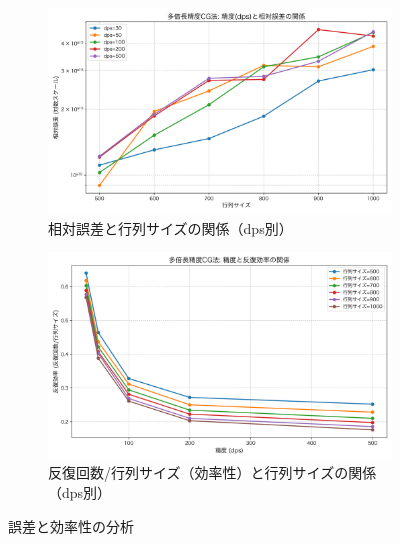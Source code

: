 \documentclass{article}
\begin{document}
\begin{figure}[H]
    \centering
    \begin{subfigure}[b]{0.48\textwidth}
        \centering
        \includegraphics[width=\textwidth]{mpmath_error_plot.png}
        \caption{相対誤差と行列サイズの関係（dps別）}
        \label{fig:error_vs_dim}
    \end{subfigure}
    \hfill
    \begin{subfigure}[b]{0.48\textwidth}
        \centering
        \includegraphics[width=\textwidth]{mpmath_efficiency_plot.png}
        \caption{反復回数/行列サイズ（効率性）と行列サイズの関係（dps別）}
        \label{fig:efficiency_vs_dim}
    \end{subfigure}
    \caption{誤差と効率性の分析}
    \label{fig:error_efficiency}
\end{figure}
\end{document}
